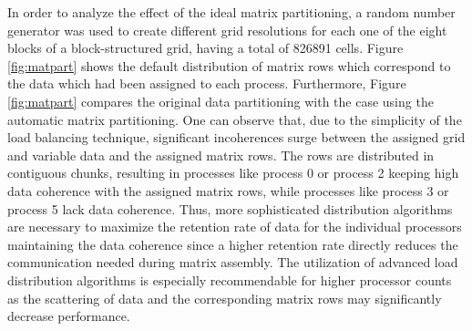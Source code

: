 In order to analyze the effect of the ideal matrix partitioning, a random number generator was used to create different grid resolutions for each one of the eight blocks of a block-structured grid, having a total of 826891 cells. Figure \ref{fig:matpart} shows the default distribution of matrix rows which correspond to the data which had been assigned to each process. Furthermore, Figure \ref{fig:matpart} compares the original data partitioning with the case using the automatic matrix partitioning. One can observe that, due to the simplicity of the load balancing technique, significant incoherences surge between the assigned grid and variable data and the assigned matrix rows. The rows are distributed in contiguous chunks, resulting in processes like process 0 or process 2 keeping high data coherence with the assigned matrix rows, while processes like process 3 or process 5 lack data coherence. Thus, more sophisticated distribution algorithms are necessary to maximize the retention rate of data for the individual processors maintaining the data coherence since a higher retention rate directly reduces the communication needed during matrix assembly. The utilization of advanced load distribution algorithms is especially recommendable for higher processor counts as the scattering of data and the corresponding matrix rows may significantly decrease performance.

